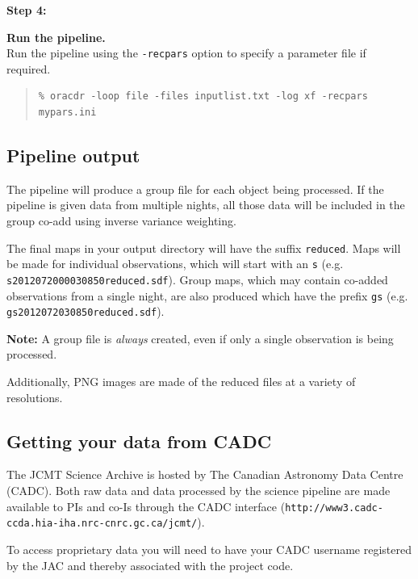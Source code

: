 \documentclass[twoside,11pt]{article}
\newcommand{\xlabel}[1]{}
\renewcommand{\_}{\texttt{\symbol{95}}}
\newenvironment{myquote}{
   \color{MidnightBlue}\begin{quote}\begin{small}}{
   \end{small}\end{quote}
}
\newcommand{\file}[1]{\texttt{#1}}
\newcommand{\url}[1]{\texttt{#1}}
\renewenvironment{myquote}{
      \begin{quote}\begin{small}}{
      \end{small}\end{quote}
   }
\begin{document}
\begin{minipage}[t]{0.15\linewidth}
\textbf{Step 4:}
\end{minipage}
\begin{minipage}[t]{0.85\linewidth}
\textbf{Run the pipeline.} \\Run the pipeline using the
\texttt{-recpars} option to specify a parameter file if required.
\begin{myquote}
\begin{verbatim}
% oracdr -loop file -files inputlist.txt -log xf -recpars mypars.ini
\end{verbatim}
\end{myquote}
\end{minipage}


\subsection{\xlabel{pl_output}Pipeline output}

The pipeline will produce a group file for each object being
processed. If the pipeline is given data from multiple nights, all
those data will be included in the group co-add using inverse variance
weighting.

The final maps in your output directory will have the suffix
\file{\_reduced}. Maps will be made for individual observations,
which will start with an \file{s} (e.g.
\file{s20120720\_00030\_850\_reduced.sdf}). Group maps, which may contain
co-added observations from a single night, are also produced which
have the prefix \file{gs} (e.g. \file{gs20120720\_30\_850\_reduced.sdf}).

\textbf{Note:} A group file is \emph{always} created, even if only a single
observation is being processed.

Additionally, PNG images are made of the reduced files at a variety of
resolutions.

\subsection{\xlabel{cadc}Getting your data from CADC}

The JCMT Science Archive is hosted by The Canadian Astronomy Data
Centre (CADC). Both raw data and data processed by the science pipeline
are made available to PIs and co-Is through the CADC interface
(\url{http://www3.cadc-ccda.hia-iha.nrc-cnrc.gc.ca/jcmt/}).

To access proprietary data you will need to have your CADC username
registered by the JAC and thereby associated with the project code.
\end{document}
